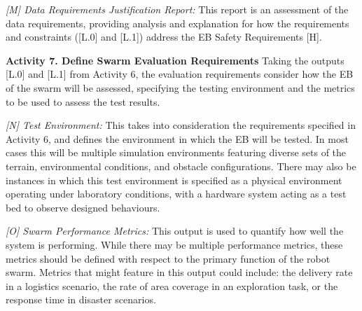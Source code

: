 \documentclass[runningheads]{llncs}
\begin{document}
\emph{[M] Data Requirements Justification Report:}
This report is an assessment of the data requirements, providing analysis and explanation for how the requirements and constraints ([L.0] and [L.1]) address the EB Safety Requirements [H].

\noindent\textbf{Activity 7. Define Swarm Evaluation Requirements} Taking the outputs [L.0] and [L.1] from Activity 6, the evaluation requirements consider how the EB of the swarm will be assessed, specifying the testing environment and the metrics to be used to assess the test results. %

\emph{[N] Test Environment:} This takes into consideration the requirements specified in Activity 6, and defines the environment in which the EB will be tested. In most cases this will be multiple simulation environments featuring diverse sets of the terrain, environmental conditions, and obstacle configurations. There may also be instances in which this test environment is specified as a physical environment operating under laboratory conditions, with a hardware system acting as a test bed to observe designed behaviours.

\emph{[O] Swarm Performance Metrics:} This output is used to quantify how well the system is performing. While there may be multiple performance metrics, these metrics should be defined with respect to the primary function of the robot swarm. Metrics that might feature in this output could include: the delivery rate in a logistics scenario, the rate of area coverage in an exploration task, or the response time in disaster scenarios.
\end{document}
